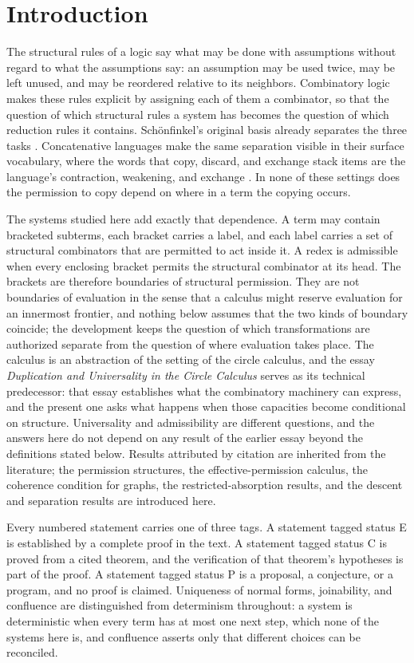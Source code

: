 \documentclass[11pt]{article}
\theoremstyle{definition}
\theoremstyle{remark}
\begin{document}
\section{Introduction}

The structural rules of a logic say what may be done with assumptions without regard to what the assumptions say: an assumption may be used twice, may be left unused, and may be reordered relative to its neighbors. Combinatory logic makes these rules explicit by assigning each of them a combinator, so that the question of which structural rules a system has becomes the question of which reduction rules it contains. Sch\"onfinkel's original basis already separates the three tasks \citep{schonfinkel1924}. Concatenative languages make the same separation visible in their surface vocabulary, where the words that copy, discard, and exchange stack items are the language's contraction, weakening, and exchange \citep{pestov2010}. In none of these settings does the permission to copy depend on where in a term the copying occurs.

The systems studied here add exactly that dependence. A term may contain bracketed subterms, each bracket carries a label, and each label carries a set of structural combinators that are permitted to act inside it. A redex is admissible when every enclosing bracket permits the structural combinator at its head. The brackets are therefore boundaries of structural permission. They are not boundaries of evaluation in the sense that a calculus might reserve evaluation for an innermost frontier, and nothing below assumes that the two kinds of boundary coincide; the development keeps the question of which transformations are authorized separate from the question of where evaluation takes place. The calculus is an abstraction of the setting of the circle calculus, and the essay \emph{Duplication and Universality in the Circle Calculus} serves as its technical predecessor: that essay establishes what the combinatory machinery can express, and the present one asks what happens when those capacities become conditional on structure. Universality and admissibility are different questions, and the answers here do not depend on any result of the earlier essay beyond the definitions stated below. Results attributed by citation are inherited from the literature; the permission structures, the effective-permission calculus, the coherence condition for graphs, the restricted-absorption results, and the descent and separation results are introduced here.

Every numbered statement carries one of three tags. A statement tagged status E is established by a complete proof in the text. A statement tagged status C is proved from a cited theorem, and the verification of that theorem's hypotheses is part of the proof. A statement tagged status P is a proposal, a conjecture, or a program, and no proof is claimed. Uniqueness of normal forms, joinability, and confluence are distinguished from determinism throughout: a system is deterministic when every term has at most one next step, which none of the systems here is, and confluence asserts only that different choices can be reconciled.
\end{document}
